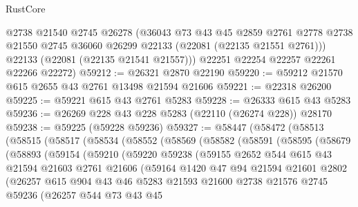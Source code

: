 \begin{lexlean}{RustCore}
\begin{coremodule}
        @2738
        @21540
        @2745
        @26278
        (@36043
          @73
          @43
          @45
          @2859
          @2761
          @2778
          @2738
          @21550
          @2745
          @36060
          @26299
          @22133
          (@22081 (@22135 @21551 @2761)))
        @22133
        (@22081 (@22135 @21541 @21557)))
      @22251
      @22254
      @22257
      @22261
      @22266
      @22272)
@59212 := @26321 @2870 @22190
@59220 := @59212 @21570 @615 @2655 @43 @2761 @13498 @21594 @21606
@59221 := @22318 @26200
@59225 := @59221 @615 @43 @2761 @5283
@59228 := @26333 @615 @43 @5283
@59236 := @26269 @228 @43 @228 @5283 (@22110 (@26274 @228)) @28170
@59238 := @59225 (@59228 @59236)
@59327 := @58447
    (@58472
      (@58513
        (@58515
          (@58517
            (@58534
              (@58552
                (@58569
                  (@58582
                    (@58591
                      (@58595
                        (@58679
                          (@58893
                            (@59154
                              (@59210
                                (@59220
                                  @59238
                                  (@59155
                                    @2652
                                    @544
                                    @615
                                    @43
                                    @21594
                                    @21603
                                    @2761
                                    @21606
                                    (@59164
                                      @1420
                                      @47
                                      @94
                                      @21594
                                      @21601
                                      @2802
                                      (@26257
                                        @615
                                        @904
                                        @43
                                        @46
                                        @5283
                                        @21593
                                        @21600
                                        @2738
                                        @21576
                                        @2745
                                        @59236
                                        (@26257
                                          @544
                                          @73
                                          @43
                                          @45

\end{coremodule}
\end{lexlean}
